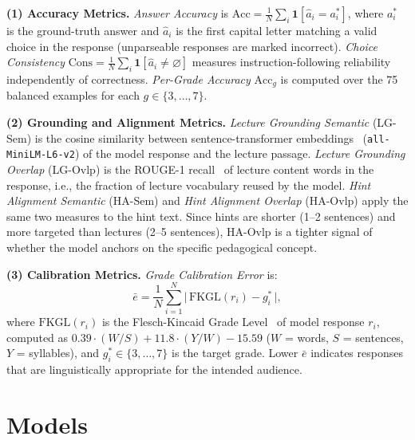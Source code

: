 \documentclass[journal]{IEEEtran}
\begin{document}
\textbf{(1) Accuracy Metrics.}
\emph{Answer Accuracy} is $\text{Acc} = \frac{1}{N}\sum_i \mathbf{1}[\hat{a}_i = a_i^*]$,
where $a_i^*$ is the ground-truth answer and $\hat{a}_i$ is the first capital
letter matching a valid choice in the response (unparseable responses are
marked incorrect).
\emph{Choice Consistency} $\text{Cons} = \frac{1}{N}\sum_i \mathbf{1}[\hat{a}_i \neq \varnothing]$
measures instruction-following reliability independently of correctness.
\emph{Per-Grade Accuracy} $\text{Acc}_g$ is computed over the 75 balanced
examples for each $g \in \{3,\ldots,7\}$.

\textbf{(2) Grounding and Alignment Metrics.}
\emph{Lecture Grounding Semantic} (LG-Sem) is the cosine similarity between
sentence-transformer embeddings~\cite{reimers2019sbert}
(\texttt{all-MiniLM-L6-v2}) of the model response and the lecture passage.
\emph{Lecture Grounding Overlap} (LG-Ovlp) is the ROUGE-1
recall~\cite{lin2004rouge} of lecture content words in the response, i.e.,
the fraction of lecture vocabulary reused by the model.
\emph{Hint Alignment Semantic} (HA-Sem) and \emph{Hint Alignment Overlap}
(HA-Ovlp) apply the same two measures to the hint text. Since hints are
shorter (1--2 sentences) and more targeted than lectures (2--5 sentences),
HA-Ovlp is a tighter signal of whether the model anchors on the specific
pedagogical concept.

\textbf{(3) Calibration Metrics.}
\emph{Grade Calibration Error} is:
\begin{equation}
  \bar{e} = \frac{1}{N}\sum_{i=1}^{N}\bigl|\,\text{FKGL}(r_i) - g_i^*\,\bigr|,
  \label{eq:calib}
\end{equation}
where $\text{FKGL}(r_i)$ is the Flesch-Kincaid Grade Level~\cite{kincaid1975derivation}
of model response $r_i$, computed as
$0.39\cdot(W/S) + 11.8\cdot(Y/W) - 15.59$
($W$ = words, $S$ = sentences, $Y$ = syllables), and $g_i^* \in \{3,\ldots,7\}$
is the target grade. Lower $\bar{e}$ indicates responses that are
linguistically appropriate for the intended audience.

\section{Models}
\label{sec:models}
\end{document}
